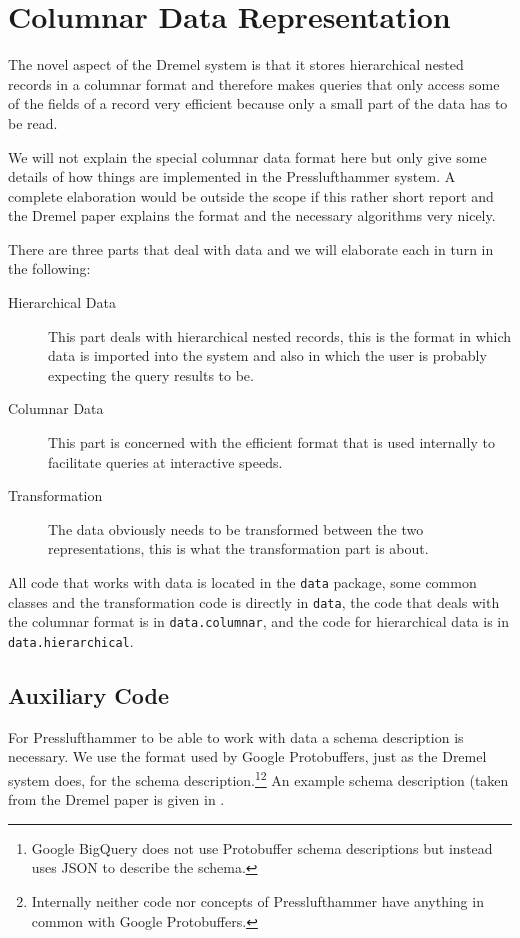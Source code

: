 \section{Columnar Data Representation}
The novel aspect of the Dremel system is that it stores hierarchical nested
records in a columnar format and therefore makes queries that only
access some of the fields of a record very efficient because only a small
part of the data has to be read.

We will not explain the special columnar data format here but only give
some details of how things are implemented in the Presslufthammer
system. A complete elaboration would be outside the scope if this
rather short report and the Dremel paper \cite{melnik2010dremel}
explains the format and the necessary algorithms very nicely.

There are three parts that deal with data and we will elaborate each in
turn in the following:

\begin{description}
  \item[Hierarchical Data] This part deals with hierarchical nested records, this
    is the format in which data is imported into the system and also in which
    the user is probably expecting the query results to be.
  \item[Columnar Data] This part is concerned with the efficient format that is
    used internally to facilitate queries at interactive speeds.
  \item[Transformation] The data obviously needs to be transformed between the two
    representations, this is what the transformation part is about.
\end{description}

All code that works with data is located in the \texttt{data} package,
some common classes and the transformation code is directly in \texttt{data},
the code that deals with the columnar format is in \texttt{data.columnar},
and the code for hierarchical data is in \texttt{data.hierarchical}.

\subsection{Auxiliary Code}
For Presslufthammer to be able to work with data a schema description is
necessary. We use the format used by Google Protobuffers, just as
the Dremel system does, for the schema description.\footnote{Google BigQuery
\cite{bigquery} does not use Protobuffer schema descriptions but instead uses
JSON to describe the schema.}\footnote{Internally neither code nor concepts
of Presslufthammer have anything in common with Google Protobuffers.}
An example schema description (taken from the Dremel paper \cite{melnik2010dremel}
is given in .

